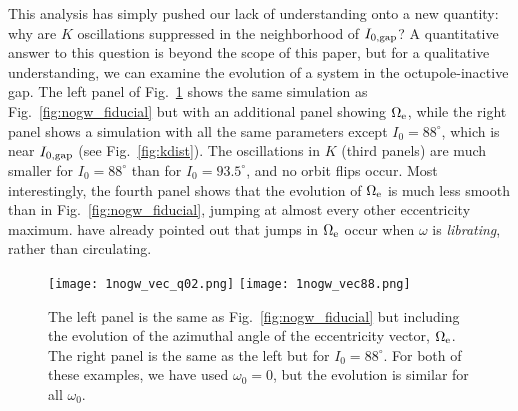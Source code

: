 \documentclass[
        fleqn,
        usenatbib,
    ]{mnras}
\begin{document}
This analysis has simply pushed our lack of understanding onto a new quantity:
why are $K$ oscillations suppressed in the neighborhood of $I_{\rm 0, gap}$? A
quantitative answer to this question is beyond the scope of this paper, but for
a qualitative understanding, we can examine the evolution of a system in the
octupole-inactive gap. The left panel of Fig.~\ref{fig:nogw_circ} shows the same
simulation as Fig.~\ref{fig:nogw_fiducial} but with an additional panel showing
$\Omega_{\rm e}$, while the right panel shows a simulation with all the same
parameters except $I_0 = 88^\circ$, which is near $I_{\rm 0, gap}$ (see
Fig.~\ref{fig:kdist}). The oscillations in $K$ (third panels) are much smaller
for $I_0 = 88^\circ$ than for $I_0 = 93.5^\circ$, and no orbit flips occur. Most
interestingly, the fourth panel shows that the evolution of $\Omega_{\rm e}$ is
much less smooth than in Fig.~\ref{fig:nogw_fiducial}, jumping at almost every
other eccentricity maximum. \citet{katz2011long} have already pointed out that
jumps in $\Omega_{\rm e}$ occur when $\omega$ is \emph{librating}, rather than
circulating.

\begin{figure}
    \centering
    \texttt{[image: 1nogw\_vec\_q02.png]}
    \texttt{[image: 1nogw\_vec88.png]}
    \caption{The left panel is the same as Fig.~\ref{fig:nogw_fiducial} but
    including the evolution of the azimuthal angle of the eccentricity vector,
    $\Omega_{\rm e}$. The right panel is the same as the left but for $I_0 =
    88^\circ$. For both of these examples, we have used $\omega_0 = 0$, but the
    evolution is similar for all $\omega_0$.}\label{fig:nogw_circ}
\end{figure}
\end{document}
